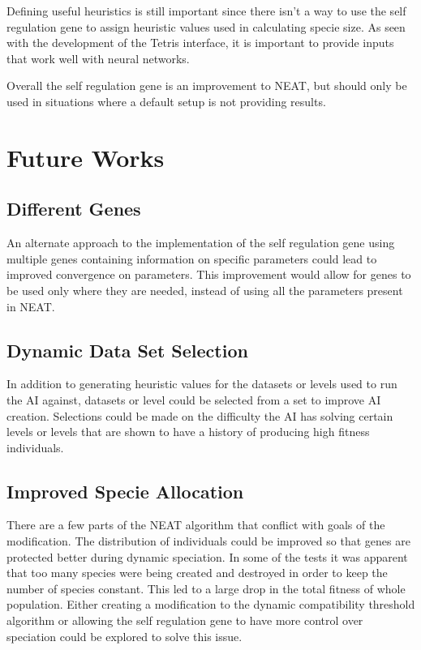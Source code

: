 \documentclass[12pt]{ucthesis} \newif\ifpdf \ifx\pdfoutput\undefined
\begin{document}
Defining useful heuristics is still important since there isn't a way to use the
self regulation gene to assign heuristic values used in calculating specie size.
As seen with the development of the Tetris interface, it is important to provide
inputs that work well with neural networks.

Overall the self regulation gene is an improvement to NEAT, but should only be
used in situations where a default setup is not providing results.

\section{Future Works}

\subsection{Different Genes}

An alternate approach to the implementation of the self regulation gene using
multiple genes containing information on specific parameters could lead to
improved convergence on parameters. This improvement would allow for genes to be
used only where they are needed, instead of using all the parameters present in
NEAT.
\subsection{Dynamic Data Set Selection}

In addition to generating heuristic values for the datasets or levels used to
run the AI against, datasets or level could be selected from a set to improve
AI creation. Selections could be made on  the difficulty the AI has solving certain
levels or levels that are shown to have a history of producing high fitness
individuals.
\subsection{Improved Specie Allocation}

There are a few parts of the NEAT algorithm that conflict with goals of the
modification. The distribution of individuals could be improved so that genes
are protected better during dynamic speciation. In some of the tests it was
apparent that too many species were being created and destroyed in order to keep
the number of species constant. This led to a large drop in the total fitness of
whole population. Either creating a modification to the dynamic compatibility
threshold algorithm or allowing the self regulation gene to have more control
over speciation could be explored to solve this issue.
\end{document}
